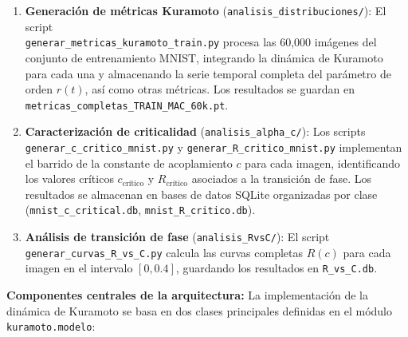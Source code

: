 \documentclass[12pt]{article}
\begin{document}
\begin{enumerate}
    \item \textbf{Generación de métricas Kuramoto} (\texttt{analisis\_distribuciones/}):
     El script \\
     \texttt{generar\_metricas\_kuramoto\_train.py} procesa las 60,000 imágenes del conjunto de entrenamiento MNIST, integrando la dinámica de Kuramoto para cada una y almacenando la serie temporal completa del parámetro de orden \(r(t)\), así como otras métricas. Los resultados se guardan en \texttt{metricas\_completas\_TRAIN\_MAC\_60k.pt}.
     

    \item \textbf{Caracterización de criticalidad} (\texttt{analisis\_alpha\_c/}): Los scripts\\ \texttt{generar\_c\_critico\_mnist.py} y \texttt{generar\_R\_critico\_mnist.py} implementan el barrido de la constante de acoplamiento \(c\) para cada imagen, identificando los valores críticos \(c_{\text{crítico}}\) y \(R_{\text{crítico}}\) asociados a la transición de fase. Los resultados se almacenan en bases de datos SQLite organizadas por clase (\texttt{mnist\_c\_critical.db}, \texttt{mnist\_R\_critico.db}).

    \item \textbf{Análisis de transición de fase} (\texttt{analisis\_RvsC/}): El script\\ \texttt{generar\_curvas\_R\_vs\_C.py} calcula las curvas completas \(R(c)\) para cada imagen en el intervalo \([0, 0.4]\), guardando los resultados en \texttt{R\_vs\_C.db}. 
\end{enumerate}

\textbf{Componentes centrales de la arquitectura:} La implementación de la dinámica de Kuramoto se basa en dos clases principales definidas en el módulo \texttt{kuramoto.modelo}:
\end{document}
